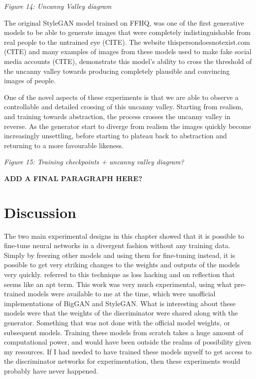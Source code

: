 \textit{Figure 14: Uncanny Valley diagram}

The original StyleGAN model trained on FFHQ, was one of the first generative models to be able to generate images that were completely indistinguishable from real people to the untrained eye (CITE). 
The website thispersondoesnotexist.com (CITE) and many examples of images from these models used to make fake social media accounts (CITE), demonstrate this model's ability to cross the threshold of the uncanny valley towards producing completely plausible and convincing images of people.

One of the novel aspects of these experiments is that we are able to observe a controllable and detailed crossing of this uncanny valley. 
Starting from realism, and training towards abstraction, the process crosses the uncanny valley in reverse. 
As the generator start to diverge from realism the images quickly become increasingly unsettling, before starting to plateau back to abstraction and returning to a more favourable likeness.

\textit{Figure 15: Training checkpoints + uncanny valley diagram?}

\textbf{ADD A FINAL PARAGRAPH HERE?}

\section{Discussion}

The two main experimental designs in this chapter showed that it is possible to fine-tune neural networks in a divergent fashion without any training data. 
Simply by freezing other models and using them for fine-tuning instead, it is possible to get very striking changes to the weights and outputs of the models very quickly. 
\cite{berns2020bridging} referred to this technique as loss hacking and on reflection that seems like an apt term. 
This work was very much experimental, using what pre-trained models were available to me at the time, which were unofficial implementations of BigGAN and StyleGAN. 
What is interesting about these models were that the weights of the discriminator were shared along with the generator. 
Something that was not done with the official model weights, or subsequent models. 
Training these models from scratch takes a huge amount of computational power, and would have been outside the realms of possibility given my resources. 
If I had needed to have trained these models myself to get access to the discriminator networks for experimentation, then these experiments would probably have never happened. 

